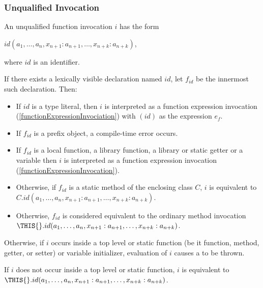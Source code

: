 \documentclass{article}
\begin{document}
\subsubsection{Unqualified Invocation}

\LMHash{}
An unqualified function invocation $i$ has the form

$id(a_1, \ldots, a_n, x_{n+1}: a_{n+1}, \ldots, x_{n+k}: a_{n+k})$,

where $id$ is an identifier.

\LMHash{}
If there exists a lexically visible declaration named $id$, let $f_{id}$ be the innermost such declaration.
Then:
\begin{itemize}
\item
If $id$ is a type literal, then $i$ is interpreted as a function expression invocation (\ref{functionExpressionInvociation}) with $(id)$ as the expression $e_f$.
\item
If $f_{id}$ is a prefix object, a compile-time error occurs.
\item
If $f_{id}$ is a local function, a library function, a library or static getter or a variable then $i$ is interpreted as a function expression invocation (\ref{functionExpressionInvocation}).
\item
Otherwise, if $f_{id}$ is a static method of the enclosing class $C$, $i$ is equivalent to $C.id(a_1, \ldots , a_n, x_{n+1}: a_{n+1}, \ldots , x_{n+k}: a_{n+k})$.
\item Otherwise, $f_{id}$ is considered equivalent to the ordinary method invocation $\THIS{}.id(a_1, \ldots , a_n, x_{n+1}: a_{n+1}, \ldots , x_{n+k}: a_{n+k})$.
\end{itemize}

\LMHash{}
Otherwise, if $i$ occurs inside a top level or static function (be it function, method, getter, or setter) or variable initializer, evaluation of $i$ causes a  to be thrown.

\LMHash{}
If $i$ does not occur inside a top level or static function, $i$ is equivalent to $\THIS{}.id(a_1, \ldots , a_n, x_{n+1}: a_{n+1}, \ldots , x_{n+k}: a_{n+k})$.

\end{document}
